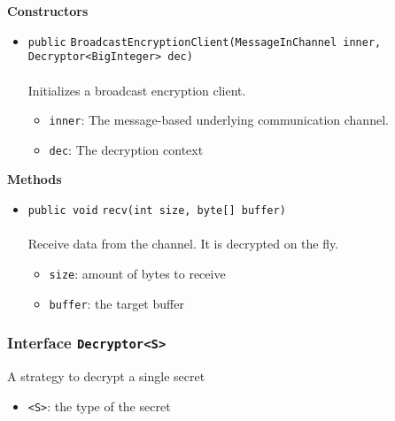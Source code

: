 \textbf{\sffamily Constructors}
\begin{itemize}
\item \lstinline|public| \lstinline|BroadcastEncryptionClient|\lstinline|(MessageInChannel inner, Decryptor<BigInteger> dec)|\\ \\[-0.6em]
Initializes a broadcast encryption client.
\begin{itemize}
\item \lstinline|inner|: The message-based underlying communication channel.
\item \lstinline|dec|: The decryption context
\end{itemize}



\end{itemize}


\textbf{\sffamily Methods}
\begin{itemize}
\item \lstinline|public void| \lstinline|recv|\lstinline|(int size, byte[] buffer)|\\ \\[-0.6em]
Receive data from the channel. It is decrypted on the fly.
\begin{itemize}
\item \lstinline|size|: amount of bytes to receive
\item \lstinline|buffer|: the target buffer
\end{itemize}



\end{itemize}

\subsubsection{Interface \lstinline|Decryptor<S>|}
A strategy to decrypt a single secret \\
\noindent\begin{minipage}[t]{5cm}
\vspace{0.3em}
\hspace*{2em}
\vspace{0.3em}
\end{minipage}

\begin{itemize}
\item \lstinline|<S>|: the type of the secret
\end{itemize}




